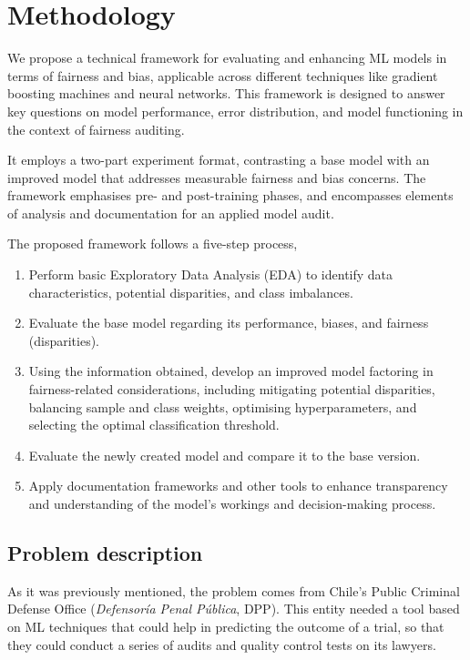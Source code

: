 \documentclass[fleqn,10pt]{wlscirep}
\begin{document}
\section{Methodology}
\label{methods}

We propose a technical framework for evaluating and enhancing ML models in terms of fairness and bias, applicable across different techniques like gradient boosting machines and neural networks. This framework is designed to answer key questions on model performance, error distribution, and model functioning in the context of fairness auditing.

It employs a two-part experiment format, contrasting a base model with an improved model that addresses measurable fairness and bias concerns. The framework emphasises pre- and post-training phases, and encompasses elements of analysis and documentation for an applied model audit.

The proposed framework follows a five-step process,

\begin{enumerate}
    \item Perform basic Exploratory Data Analysis (EDA) to identify data characteristics, potential disparities, and class imbalances.
    \item Evaluate the base model regarding its performance, biases, and fairness (disparities).
    \item Using the information obtained, develop an improved model factoring in fairness-related considerations, including mitigating potential disparities, balancing sample and class weights, optimising hyperparameters, and selecting the optimal classification threshold.
    \item Evaluate the newly created model and compare it to the base version.
    \item Apply documentation frameworks and other tools to enhance transparency and understanding of the model's workings and decision-making process.
\end{enumerate}

\subsection{Problem description}

As it was previously mentioned, the problem comes from Chile's Public Criminal Defense Office (\textit{Defensoría Penal Pública}, DPP). This entity needed a tool based on ML techniques that could help in predicting the outcome of a trial, so that they could conduct a series of audits and quality control tests on its lawyers. 
\end{document}
